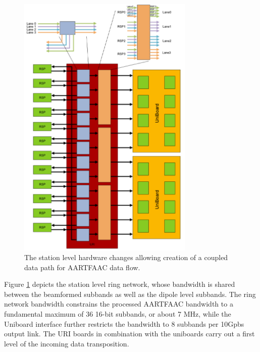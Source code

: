 \documentclass{aa}
\begin{document}
\begin{figure}[htbp]
\centering
\includegraphics[width=0.75\textwidth]{Figs/station_hw_proc_afaac.png}
\caption{The station level hardware changes  allowing creation of a coupled data
  path for AARTFAAC data flow.}
\label{fig:afaac_station_hw}
\end{figure}

Figure \ref{fig:afaac_station_hw} depicts the  station level ring network, whose
bandwidth is shared between the beamformed  subbands as well as the dipole level
subbands. The ring network bandwidth constrains the processed AARTFAAC bandwidth
to  a fundamental  maximum of  36 16-bit  subbands, or  about 7  MHz, while  the
Uniboard  interface further  restricts the  bandwidth to  8 subbands  per 10Gpbs
output link. The URI boards in combination  with the uniboards carry out a first
level of the incoming data transposition.
\end{document}
